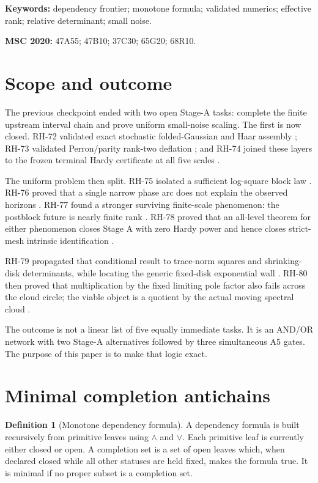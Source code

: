 \documentclass[11pt]{article}
\theoremstyle{definition}
\newtheorem{definition}[theorem]{Definition}
\theoremstyle{remark}
\begin{document}
\noindent\textbf{Keywords:} dependency frontier; monotone formula; validated
numerics; effective rank; relative determinant; small noise.

\medskip
\noindent\textbf{MSC 2020:} 47A55; 47B10; 37C30; 65G20; 68R10.

\section{Scope and outcome}

The previous checkpoint ended with two open Stage-A tasks: complete the
finite upstream interval chain and prove uniform small-noise scaling.  The
first is now closed.  RH-72 validated exact stochastic folded-Gaussian and
Haar assembly \citep{WangAssembly2026}; RH-73 validated Perron/parity
rank-two deflation \citep{WangDeflation2026}; and RH-74 joined these layers to
the frozen terminal Hardy certificate at all five scales
\citep{WangBridge2026}.

The uniform problem then split.  RH-75 isolated a sufficient log-square block
law \citep{WangBlockLaw2026}.  RH-76 proved that a single narrow phase arc does
not explain the observed horizons \citep{WangArcBarrier2026}.  RH-77 found a
stronger surviving finite-scale phenomenon: the postblock future is nearly
finite rank \citep{WangRankCompression2026}.  RH-78 proved that an all-level
theorem for either phenomenon closes Stage A with zero Hardy power and hence
closes strict-mesh intrinsic identification \citep{WangTwoCorridors2026}.

RH-79 propagated that conditional result to trace-norm squares and
shrinking-disk determinants, while locating the generic fixed-disk
exponential wall \citep{WangDiagonalTransfer2026}.  RH-80 then proved that
multiplication by the fixed limiting pole factor also fails across the cloud
circle; the viable object is a quotient by the actual moving spectral cloud
\citep{WangMovingCloud2026}.

The outcome is not a linear list of five equally immediate tasks.  It is an
AND/OR network with two Stage-A alternatives followed by three simultaneous
A5 gates.  The purpose of this paper is to make that logic exact.

\section{Minimal completion antichains}

\begin{definition}[Monotone dependency formula]
A dependency formula is built recursively from primitive leaves using
$\wedge$ and $\vee$.  Each primitive leaf is currently either closed or open.
A completion set is a set of open leaves which, when declared closed while all
other statuses are held fixed, makes the formula true.  It is minimal if no
proper subset is a completion set.
\end{definition}
\end{document}
